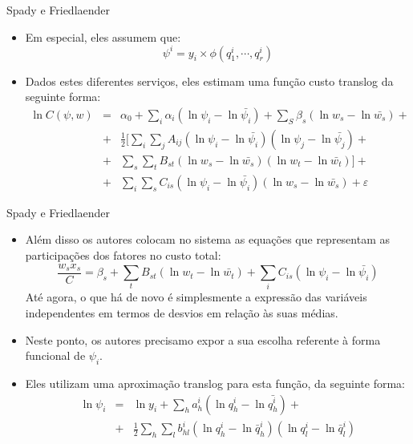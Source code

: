 \documentclass{beamer}
\begin{document}
\begin{frame}{Spady e Friedlaender}
\tiny
\begin{itemize}
\item Em especial, eles assumem que:
\[
\psi^{i}=y_{i}\times\phi(q_{1}^{i},\cdots,q_{r}^{i})
\]
\item Dados estes diferentes serviços, eles estimam uma função custo translog
da seguinte forma:
\begin{eqnarray*}
\ln C(\psi,w) & = & \alpha_{0}+\sum_{i}\alpha_{i}(\ln\psi_{i}-\ln\bar{\psi_{i}})+\sum_{S}\beta_{s}(\ln w_{s}-\ln\bar{w_{s}})+\\
 & + & \frac{1}{2}[\sum_{i}\sum_{j}A_{ij}(\ln\psi_{i}-\ln\bar{\psi_{i}})(\ln\psi_{j}-\ln\bar{\psi_{j}})+\\
 & + & \sum_{s}\sum_{t}B_{st}(\ln w_{s}-\ln\bar{w_{s}})(\ln w_{t}-\ln\bar{w_{t}})]+\\
 & + & \sum_{i}\sum_{s}C_{is}(\ln\psi_{i}-\ln\bar{\psi_{i}})(\ln w_{s}-\ln\bar{w_{s}})+\varepsilon
\end{eqnarray*}
\end{itemize}


\end{frame}

\begin{frame}{Spady e Friedlaender}

\begin{itemize}
\item Além disso os autores colocam no sistema as equações que representam
as participações dos fatores no custo total:
\[
\frac{w_{s}x_{s}}{C}=\beta_{s}+\sum_{t}B_{st}(\ln w_{t}-\ln\bar{w_{t}})+\sum_{i}C_{is}(\ln\psi_{i}-\ln\bar{\psi_{i}})
\]
Até agora, o que há de novo é simplesmente a expressão das variáveis
independentes em termos de desvios em relação às suas médias. 
\item Neste ponto, os autores precisamo expor a sua escolha referente à
forma funcional de $\psi_{i}$. 
\item Eles utilizam uma aproximação translog para esta função, da seguinte
forma:
{\tiny{}
\begin{eqnarray*}
\ln\psi_{i} & = & \ln y_{i}+\sum_{h}a_{h}^{i}(\ln q_{h}^{i}-\ln\bar{q_{h}^{i}})+\\
 & + & \frac{1}{2}\sum_{h}\sum_{l}b_{hl}^{i}(\ln q_{h}^{i}-\ln\bar{q}_{h}^{i})(\ln q_{l}^{i}-\ln\bar{q}_{l}^{i})
\end{eqnarray*}}
\end{itemize}


\end{frame}
\end{document}
